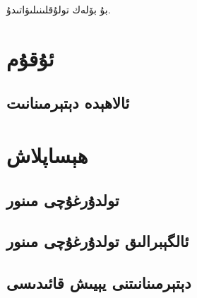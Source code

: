 بۇ بۆلەك تولۇقلىنىلىۋاتىدۇ.

\section{ئۇقۇم}
\subsection{ئالاھېدە دېتېرمىنانىت}

\section{ھېساپلاش}
\subsection{تولدۇرغۇچى مىنور}
\subsection{ئالگېبرالىق تولدۇرغۇچى مىنور}
\subsection{دېتېرمىنانىتنى يېيىش قائىدىسى}
